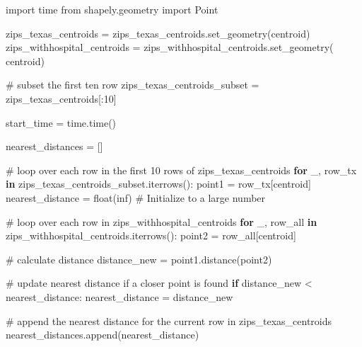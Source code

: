 \documentclass[
  letterpaper,
  DIV=11,
  numbers=noendperiod]{scrartcl}
\newenvironment{Shaded}{\begin{snugshade}}{\end{snugshade}}
\newcommand{\BuiltInTok}[1]{\textcolor[rgb]{0.00,0.23,0.31}{#1}}
\newcommand{\CommentTok}[1]{\textcolor[rgb]{0.37,0.37,0.37}{#1}}
\newcommand{\ControlFlowTok}[1]{\textcolor[rgb]{0.00,0.23,0.31}{\textbf{#1}}}
\newcommand{\DecValTok}[1]{\textcolor[rgb]{0.68,0.00,0.00}{#1}}
\newcommand{\ImportTok}[1]{\textcolor[rgb]{0.00,0.46,0.62}{#1}}
\newcommand{\KeywordTok}[1]{\textcolor[rgb]{0.00,0.23,0.31}{\textbf{#1}}}
\newcommand{\NormalTok}[1]{\textcolor[rgb]{0.00,0.23,0.31}{#1}}
\newcommand{\OperatorTok}[1]{\textcolor[rgb]{0.37,0.37,0.37}{#1}}
\newcommand{\StringTok}[1]{\textcolor[rgb]{0.13,0.47,0.30}{#1}}
\begin{document}
\begin{Shaded}
\begin{Highlighting}[]
\ImportTok{import}\NormalTok{ time}
\ImportTok{from}\NormalTok{ shapely.geometry }\ImportTok{import}\NormalTok{ Point}

\NormalTok{zips\_texas\_centroids }\OperatorTok{=}\NormalTok{ zips\_texas\_centroids.set\_geometry(}\StringTok{\textquotesingle{}centroid\textquotesingle{}}\NormalTok{)}
\NormalTok{zips\_withhospital\_centroids }\OperatorTok{=}\NormalTok{ zips\_withhospital\_centroids.set\_geometry(}
    \StringTok{\textquotesingle{}centroid\textquotesingle{}}\NormalTok{)}

\CommentTok{\# subset the first ten row}
\NormalTok{zips\_texas\_centroids\_subset }\OperatorTok{=}\NormalTok{ zips\_texas\_centroids[:}\DecValTok{10}\NormalTok{]}

\NormalTok{start\_time }\OperatorTok{=}\NormalTok{ time.time()}

\NormalTok{nearest\_distances }\OperatorTok{=}\NormalTok{ []}

\CommentTok{\# loop over each row in the first 10 rows of zips\_texas\_centroids}
\ControlFlowTok{for}\NormalTok{ \_, row\_tx }\KeywordTok{in}\NormalTok{ zips\_texas\_centroids\_subset.iterrows():}
\NormalTok{    point1 }\OperatorTok{=}\NormalTok{ row\_tx[}\StringTok{\textquotesingle{}centroid\textquotesingle{}}\NormalTok{]}
\NormalTok{    nearest\_distance }\OperatorTok{=} \BuiltInTok{float}\NormalTok{(}\StringTok{\textquotesingle{}inf\textquotesingle{}}\NormalTok{)  }\CommentTok{\# Initialize to a large number}

    \CommentTok{\# loop over each row in zips\_withhospital\_centroids}
    \ControlFlowTok{for}\NormalTok{ \_, row\_all }\KeywordTok{in}\NormalTok{ zips\_withhospital\_centroids.iterrows():}
\NormalTok{        point2 }\OperatorTok{=}\NormalTok{ row\_all[}\StringTok{\textquotesingle{}centroid\textquotesingle{}}\NormalTok{]}

        \CommentTok{\# calculate distance}
\NormalTok{        distance\_new }\OperatorTok{=}\NormalTok{ point1.distance(point2)}

        \CommentTok{\# update nearest distance if a closer point is found}
        \ControlFlowTok{if}\NormalTok{ distance\_new }\OperatorTok{\textless{}}\NormalTok{ nearest\_distance:}
\NormalTok{            nearest\_distance }\OperatorTok{=}\NormalTok{ distance\_new}

    \CommentTok{\# append the nearest distance for the current row in zips\_texas\_centroids}
\NormalTok{    nearest\_distances.append(nearest\_distance)}


\end{Highlighting}
\end{Shaded}
\end{document}
